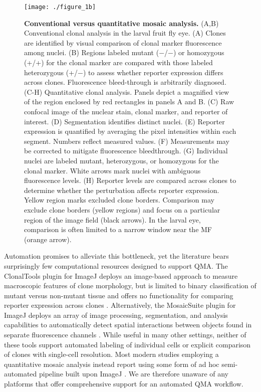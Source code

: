 \begin{figure}[!h]
\centering
\texttt{[image: ./figure\_1b]}
\caption[Conventional versus quantitative mosaic analysis.]{\textbf{Conventional versus quantitative mosaic analysis.} (A,B) Conventional clonal analysis in the larval fruit fly eye. (A) Clones are identified by visual comparison of clonal marker fluorescence among nuclei. (B) Regions labeled mutant ($-$/$-$) or homozygous (+/+) for the clonal marker are compared with those labeled heterozygous (+/$-$) to assess whether reporter expression differs across clones. Fluorescence bleed-through is arbitrarily diagnosed. (C-H) Quantitative clonal analysis. Panels depict a magnified view of the region enclosed by red rectangles in panels A and B. (C) Raw confocal image of the nuclear stain, clonal marker, and reporter of interest. (D) Segmentation identifies distinct nuclei. (E) Reporter expression is quantified by averaging the pixel intensities within each segment. Numbers reflect measured values. (F) Measurements may be corrected to mitigate fluorescence bleedthrough. (G) Individual nuclei are labeled mutant, heterozygous, or homozygous for the clonal marker. White arrows mark nuclei with ambiguous fluorescence levels. (H) Reporter levels are compared across clones to determine whether the perturbation affects reporter expression. Yellow region marks excluded clone borders. Comparison may exclude clone borders (yellow regions) and focus on a particular region of the image field (black arrows). In the larval eye, comparison is often limited to a narrow window near the MF (orange arrow).}
\label{fig:fig1b}
\end{figure}

Automation promises to alleviate this bottleneck, yet the literature bears surprisingly few computational resources designed to support QMA. The ClonalTools plugin for ImageJ deploys an image-based approach to measure macroscopic features of clone morphology, but is limited to binary classification of mutant versus non-mutant tissue and offers no functionality for comparing reporter expression across clones \cite{Mort2009}. Alternatively, the MosaicSuite plugin for ImageJ deploys an array of image processing, segmentation, and analysis capabilities to automatically detect spatial interactions between objects found in separate fluorescence channels \cite{Helmuth2010,Shivanandan2013}. While useful in many other settings, neither of these tools support automated labeling of individual cells or explicit comparison of clones with single-cell resolution. Most modern studies employing a quantitative mosaic analysis instead report using some form of ad hoc semi-automated pipeline built upon ImageJ \cite{Dai2017,Ghiglione2018,Li2018}. We are therefore unaware of any platforms that offer comprehensive support for an automated QMA workflow.

